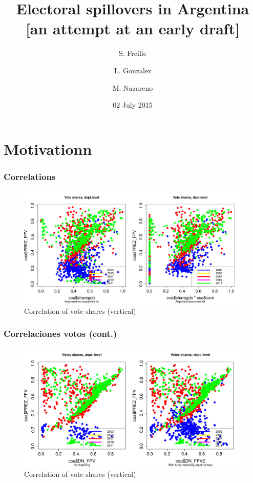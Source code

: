 \documentclass[a4paper,handout,mathserif,final,xcolor=dvipsnames,twocolumn]{beamer}
\title{Electoral spillovers in Argentina [an attempt at an early draft]}
\author{S. Freille \and  L. Gonzalez  \and M. Nazareno}
\date{02 July 2015}
\begin{document}
\maketitle




\section{Motivationn}
\begin{frame}\frametitle{Correlations}
  \begin{figure}[htbp]
    \centering
    \includegraphics[scale=0.34]{int1}
    \caption{Correlation of vote shares (vertical)}
    \label{fig:1}
  \end{figure}
\end{frame}


\begin{frame}\frametitle{Correlaciones votos (cont.)}
  \begin{figure}[htbp]
    \centering
    \includegraphics[scale=0.34]{int2}
    \caption{Correlation of vote shares (vertical)}
    \label{fig:1}
  \end{figure}
\end{frame}
\end{document}
